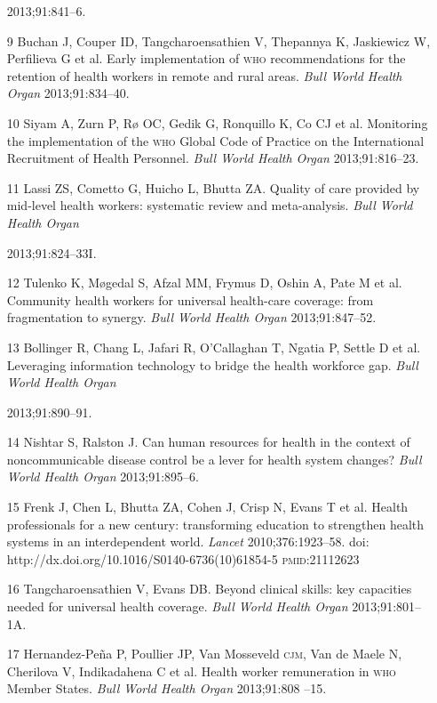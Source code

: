 \documentclass{article}
\begin{document}
\begin{itemize}
2013;91:841–6.

\item[9] Buchan J, Couper ID, Tangcharoensathien V, Thepannya K, Jaskiewicz W,
Perfilieva G
et al. Early implementation of \textsc{who} recommendations for the retention of health
workers in remote and
rural areas. \textit{Bull World Health Organ}
2013;91:834–40.

\item[10] Siyam A, Zurn P, Rø OC, Gedik G, Ronquillo K, Co CJ et al. Monitoring
the
implementation of the \textsc{who} Global Code of Practice on the International
Recruitment of Health
Personnel. \textit{Bull World Health Organ}
2013;91:816–23.

\item[11] Lassi ZS, Cometto G, Huicho L, Bhutta ZA. Quality of care provided by
mid-level
health workers: systematic review and meta-analysis. \textit{Bull World Health
Organ}

2013;91:824–33I.

\item[12] Tulenko K, Møgedal S, Afzal MM, Frymus D, Oshin A, Pate M et al.
Community health
workers for universal health-care coverage: from fragmentation to synergy.
\textit{Bull World Health
Organ}
2013;91:847–52.

\item[13] Bollinger R, Chang L, Jafari R, O’Callaghan T, Ngatia P, Settle D et
al. Leveraging
information technology to bridge the health workforce gap. \textit{Bull World
Health Organ}

2013;91:890–91.

\item[14] Nishtar S, Ralston J. Can human resources for health in the context of
noncommunicable disease control be a lever for health system changes?
\textit{Bull World Health
Organ}
2013;91:895–6.

\item[15] Frenk J, Chen L, Bhutta ZA, Cohen J, Crisp N, Evans T et al. Health
professionals
for a new century: transforming education to strengthen health systems in an
interdependent world.
\textit{Lancet}
2010;376:1923–58. doi: http://dx.doi.org/10.1016/S0140-6736(10)61854-5
\textsc{pmid}:21112623

\item[16] Tangcharoensathien V, Evans DB. Beyond clinical skills: key capacities
needed for
universal health coverage. \textit{Bull World Health Organ}
2013;91:801–1A.

\item[17] Hernandez-Peña P, Poullier JP, Van Mosseveld \textsc{cjm}, Van de Maele N,
Cherilova V,
Indikadahena C et al. Health worker remuneration in \textsc{who} Member States.
\textit{Bull World Health
Organ}
2013;91:808 –15.


\end{itemize}
\end{document}
